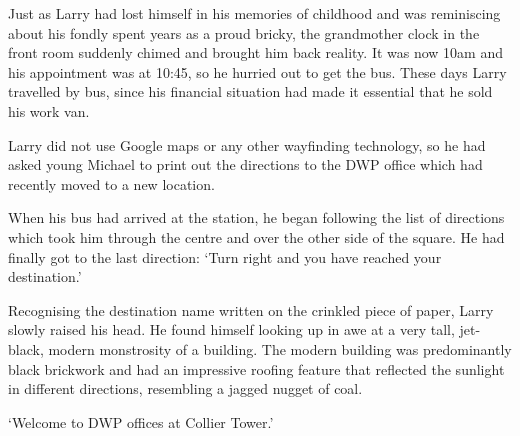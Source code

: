 Just as Larry had lost himself in his memories of childhood and was
reminiscing about his fondly spent years as a proud bricky, the
grandmother clock in the front room suddenly chimed and brought him
back reality. It was now 10am and his appointment was at 10:45, so he
hurried out to get the bus. These days Larry travelled by bus, since
his financial situation had made it essential that he sold his work
van.

Larry did not use Google maps or any other wayfinding technology, so
he had asked young Michael to print out the directions to the DWP
office which had recently moved to a new location.

When his bus had arrived at the station, he began following the list
of directions which took him through the centre and over the other
side of the square. He had finally got to the last direction: `Turn
right and you have reached your destination.'

Recognising the destination name written on the crinkled piece of
paper, Larry slowly raised his head. He found himself looking up in
awe at a very tall, jet-black, modern monstrosity of a building. The
modern building was predominantly black brickwork and had an
impressive roofing feature that reflected the sunlight in different
directions, resembling a jagged nugget of coal.

`Welcome to DWP offices at Collier Tower.'




